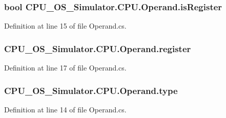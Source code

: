 \subsubsection[{is\+Register}]{\setlength{\rightskip}{0pt plus 5cm}bool C\+P\+U\+\_\+\+O\+S\+\_\+\+Simulator.\+C\+P\+U.\+Operand.\+is\+Register\hspace{0.3cm}{\ttfamily [private]}}\label{class_c_p_u___o_s___simulator_1_1_c_p_u_1_1_operand_a16cc03d0d4c600b864d9c189529a473d}


Definition at line 15 of file Operand.\+cs.

\hypertarget{class_c_p_u___o_s___simulator_1_1_c_p_u_1_1_operand_a55d446765a50844fcbbc56b757b1b679}{}
\subsubsection[{register}]{ C\+P\+U\+\_\+\+O\+S\+\_\+\+Simulator.\+C\+P\+U.\+Operand.\+register\hspace{0.3cm}{\ttfamily [private]}}\label{class_c_p_u___o_s___simulator_1_1_c_p_u_1_1_operand_a55d446765a50844fcbbc56b757b1b679}


Definition at line 17 of file Operand.\+cs.

\hypertarget{class_c_p_u___o_s___simulator_1_1_c_p_u_1_1_operand_abc8f504a22e9a5c49d91b12f61cc5119}{}
\subsubsection[{type}]{ C\+P\+U\+\_\+\+O\+S\+\_\+\+Simulator.\+C\+P\+U.\+Operand.\+type\hspace{0.3cm}{\ttfamily [private]}}\label{class_c_p_u___o_s___simulator_1_1_c_p_u_1_1_operand_abc8f504a22e9a5c49d91b12f61cc5119}


Definition at line 14 of file Operand.\+cs.

